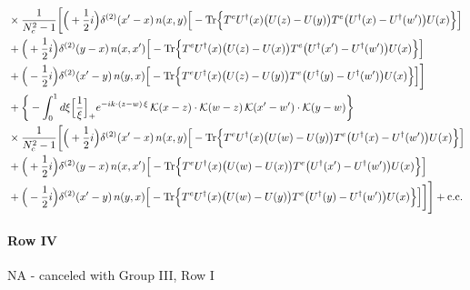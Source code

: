 \documentclass[9pt]{article}
\numberwithin{equation}{section}
\begin{document}
\begin{align}
&\times \frac{1}{N_{c}^{2}-1}\bigg[\Big(+\frac{1}{2}i\Big)\delta^{(2)}(x'-x)\,n(x,y)\Big[-{\rm Tr}\Big\{T^{e}U^{\dagger}(x)\big(U(z)-U(y)\big)T^{e}\big(U^{\dagger}(x)-U^{\dagger}(w')\big)U(x)\Big\}\Big]\notag\\
& +\Big(+\frac{1}{2}i\Big)\delta^{(2)}(y-x)\,n(x,x')\Big[-{\rm Tr}\Big\{T^{e}U^{\dagger}(x)\big(U(z)-U(x)\big)T^{e}\big(U^{\dagger}(x')-U^{\dagger}(w')\big)U(x)\Big\}\Big]\notag\\
& +\Big(-\frac{1}{2}i\Big)\delta^{(2)}(x'-y)\,n(y,x)\Big[-{\rm Tr}\Big\{T^{e}U^{\dagger}(x)\big(U(z)-U(y)\big)T^{e}\big(U^{\dagger}(y)-U^{\dagger}(w')\big)U(x)\Big\}\Big]\bigg]\notag\\
&+\bigg\{-\int_{0}^{1}d\xi\Big[\frac{1}{\xi}\Big]_{+}e^{-ik\cdot(z-w)\,\xi}\,\mathcal{K}(x-z)\cdot\mathcal{K}(w-z)\,\mathcal{K}(x'-w')\cdot\mathcal{K}(y-w)\bigg\}\notag\\
&\times \frac{1}{N_{c}^{2}-1}\bigg[\Big(+\frac{1}{2}i\Big)\delta^{(2)}(x'-x)\,n(x,y)\Big[-{\rm Tr}\Big\{T^{e}U^{\dagger}(x)\big(U(w)-U(y)\big)T^{e}\big(U^{\dagger}(x)-U^{\dagger}(w')\big)U(x)\Big\}\Big]\notag\\
& +\Big(+\frac{1}{2}i\Big)\delta^{(2)}(y-x)\,n(x,x')\Big[-{\rm Tr}\Big\{T^{e}U^{\dagger}(x)\big(U(w)-U(x)\big)T^{e}\big(U^{\dagger}(x')-U^{\dagger}(w')\big)U(x)\Big\}\Big]\notag\\
& +\Big(-\frac{1}{2}i\Big)\delta^{(2)}(x'-y)\,n(y,x)\Big[-{\rm Tr}\Big\{T^{e}U^{\dagger}(x)\big(U(w)-U(y)\big)T^{e}\big(U^{\dagger}(y)-U^{\dagger}(w')\big)U(x)\Big\}\Big]\bigg]\Bigg]+{\rm c.c.}\label{eq:S-I.III-2}
\end{align}
\paragraph*{Row IV}
\textsc{NA} - canceled with Group III, Row I
\end{document}
